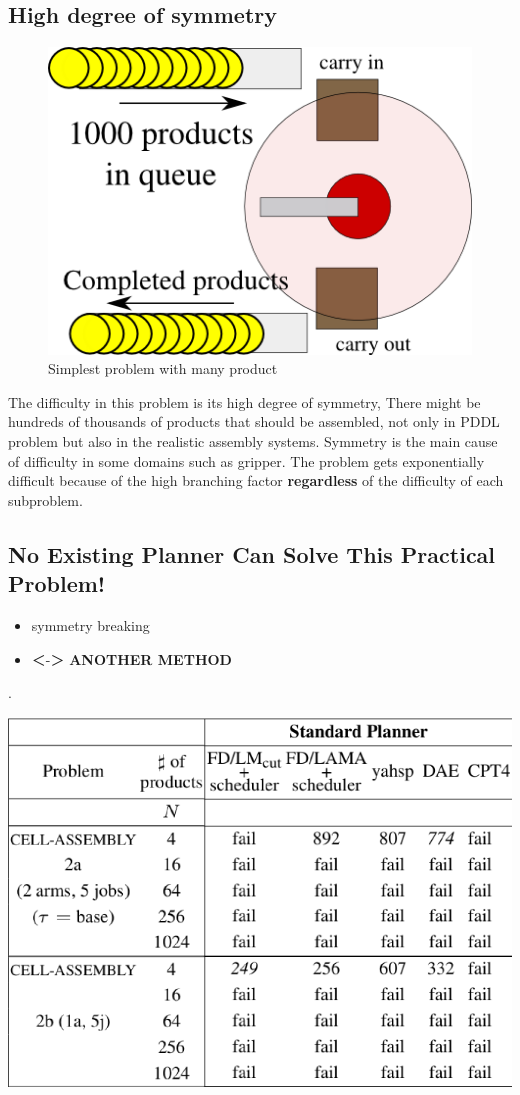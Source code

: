 \subsection{High degree of symmetry}
\label{sec-2-2}

\begin{figure}[htb]
\centering
\includegraphics[width=.6\textwidth]{img/model2a-products.png}
\caption{Simplest problem with many product}
\end{figure}

\begin{resume}
The difficulty in this problem is its high degree of symmetry,
There might be hundreds of thousands of products that should be assembled,
not only in PDDL problem but also in the realistic assembly systems.
Symmetry is the main cause of difficulty in some domains such as gripper.
The problem gets exponentially difficult because of
the high branching factor
\textbf{regardless} of the difficulty of each subproblem.
\end{resume}

\subsection{No Existing Planner Can Solve This Practical Problem!}
\label{sec-2-3}

\begin{center}
\begin{inline}
\begin{itemize}
\item symmetry breaking
\item ＜-＞ \textbf{ANOTHER METHOD}
\end{itemize}
\end{inline}

.
\end{center}

\includegraphics[width=.6\textwidth]{img/no-other-existing-planner.png}

